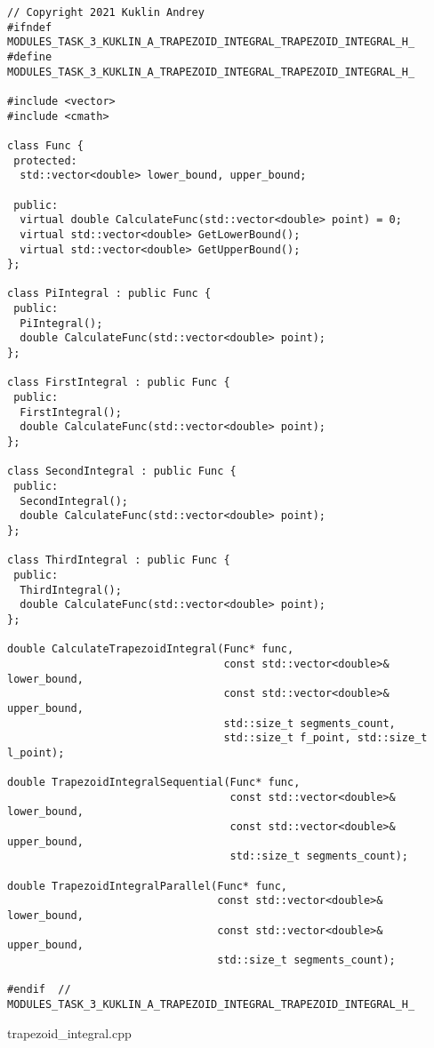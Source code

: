 \documentclass{report}
\begin{document}
\begin{lstlisting}
// Copyright 2021 Kuklin Andrey
#ifndef MODULES_TASK_3_KUKLIN_A_TRAPEZOID_INTEGRAL_TRAPEZOID_INTEGRAL_H_
#define MODULES_TASK_3_KUKLIN_A_TRAPEZOID_INTEGRAL_TRAPEZOID_INTEGRAL_H_

#include <vector>
#include <cmath>

class Func {
 protected:
  std::vector<double> lower_bound, upper_bound;

 public:
  virtual double CalculateFunc(std::vector<double> point) = 0;
  virtual std::vector<double> GetLowerBound();
  virtual std::vector<double> GetUpperBound();
};

class PiIntegral : public Func {
 public:
  PiIntegral();
  double CalculateFunc(std::vector<double> point);
};

class FirstIntegral : public Func {
 public:
  FirstIntegral();
  double CalculateFunc(std::vector<double> point);
};

class SecondIntegral : public Func {
 public:
  SecondIntegral();
  double CalculateFunc(std::vector<double> point);
};

class ThirdIntegral : public Func {
 public:
  ThirdIntegral();
  double CalculateFunc(std::vector<double> point);
};

double CalculateTrapezoidIntegral(Func* func,
                                  const std::vector<double>& lower_bound,
                                  const std::vector<double>& upper_bound,
                                  std::size_t segments_count,
                                  std::size_t f_point, std::size_t l_point);

double TrapezoidIntegralSequential(Func* func,
                                   const std::vector<double>& lower_bound,
                                   const std::vector<double>& upper_bound,
                                   std::size_t segments_count);

double TrapezoidIntegralParallel(Func* func,
                                 const std::vector<double>& lower_bound,
                                 const std::vector<double>& upper_bound,
                                 std::size_t segments_count);

#endif  //  MODULES_TASK_3_KUKLIN_A_TRAPEZOID_INTEGRAL_TRAPEZOID_INTEGRAL_H_
\end{lstlisting}
\par trapezoid\_integral.cpp
\end{document}
